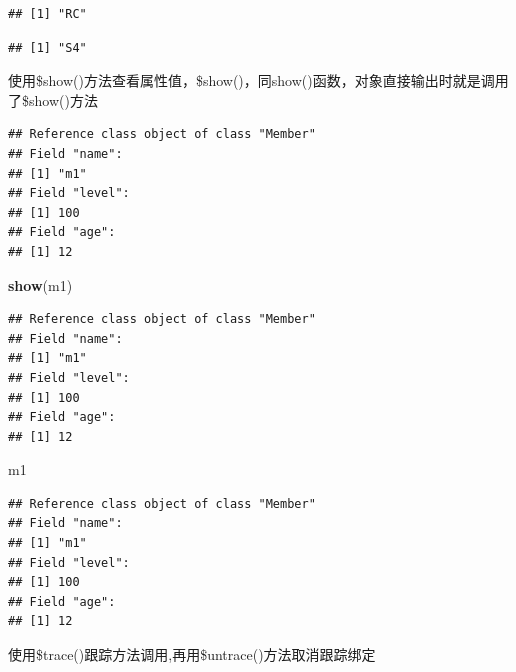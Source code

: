 \documentclass[]{book}
\newenvironment{Shaded}{\begin{snugshade}}{\end{snugshade}}
\newcommand{\KeywordTok}[1]{\textcolor[rgb]{0.13,0.29,0.53}{\textbf{#1}}}
\newcommand{\OperatorTok}[1]{\textcolor[rgb]{0.81,0.36,0.00}{\textbf{#1}}}
\newcommand{\NormalTok}[1]{#1}
\begin{document}
\begin{verbatim}
## [1] "RC"
\end{verbatim}

\begin{Shaded}
\end{Shaded}

\begin{verbatim}
## [1] "S4"
\end{verbatim}

使用\$show()方法查看属性值，\$show()，同show()函数，对象直接输出时就是调用了\$show()方法

\begin{Shaded}
\end{Shaded}

\begin{verbatim}
## Reference class object of class "Member"
## Field "name":
## [1] "m1"
## Field "level":
## [1] 100
## Field "age":
## [1] 12
\end{verbatim}

\begin{Shaded}
\begin{Highlighting}[]
\KeywordTok{show}\NormalTok{(m1)}
\end{Highlighting}
\end{Shaded}

\begin{verbatim}
## Reference class object of class "Member"
## Field "name":
## [1] "m1"
## Field "level":
## [1] 100
## Field "age":
## [1] 12
\end{verbatim}

\begin{Shaded}
\begin{Highlighting}[]
\NormalTok{m1}
\end{Highlighting}
\end{Shaded}

\begin{verbatim}
## Reference class object of class "Member"
## Field "name":
## [1] "m1"
## Field "level":
## [1] 100
## Field "age":
## [1] 12
\end{verbatim}

使用\$trace()跟踪方法调用,再用\$untrace()方法取消跟踪绑定
\end{document}
